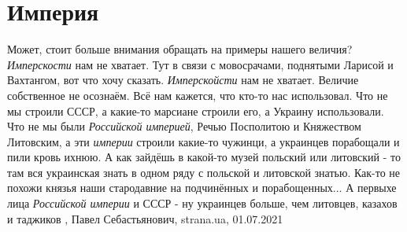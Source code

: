  
 
 
 
 
\chapter{Империя}

Может, стоит больше внимания обращать на примеры нашего величия?
\emph{Имперскости} нам не хватает. Тут в связи с мовосрачами, поднятыми
Ларисой и Вахтангом, вот что хочу сказать.  \emph{Имперскойсти} нам не хватает.
Величие собственное не осознаём. Всё нам кажется, что кто-то нас использовал.
Что не мы строили СССР, а какие-то марсиане строили его, а Украину
использовали. Что не мы были \emph{Российской империей}, Речью Посполитою и
Княжеством Литовским, а эти \emph{империи} строили какие-то чужинци, а
украинцев порабощали и пили кровь ихнюю.  А как зайдёшь в какой-то музей
польский или литовский - то там вся украинская знать в одном ряду с польской и
литовской знатью. Как-то не похожи князья наши стародавние на подчинённых и
порабощенных... А первыхе лица \emph{Российской империи} и СССР - ну украинцев
больше, чем литовцев, казахов и таджиков
, 
Павел Себастьянович, strana.ua, 01.07.2021
